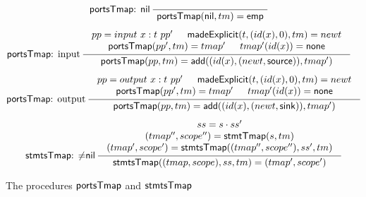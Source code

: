 
\begin{figure}[htbp]
	\begin{gather*}
		\infernone[\portstmap: \nil]
		{\seqq{\portstmap(\nil, tm) = {\sf emp}}}
		\quad
		\\[1ex]
		\infer[\portstmap: input]
		{\seqq{\portstmap(pp, tm) = \fadd((id(x), (newt, \source)), tmap')}}
		{
			\begin{array}{c}
				p p= input\ x: t\ pp' \hspace{15pt} \madeexplicit(t, (id(x),0), tm) = newt \\
				\portstmap(pp', tm) = tmap' \hspace{15pt} tmap'(id(x)) = \svnone
			\end{array}
		}
		\quad
		\\[1ex]
		\infer[\portstmap: output]
		{\seqq{\portstmap(pp, tm) =  \fadd((id(x), (newt, \sink)),tmap')}}
		{
			\begin{array}{c}
				p p= output\ x: t\ pp' \hspace{15pt} \madeexplicit(t, (id(x), 0), tm) = newt \\
				\portstmap(pp', tm) = tmap' \hspace{15pt} tmap'(id(x)) = \svnone
			\end{array}
		}
		\\[1ex]
		\infer[\stmtstmap: $\neq$\nil]
		{\seqq{\stmtstmap((tmap, scope), ss, tm) = (tmap', scope')}}
		{
			\begin{array}{c}
				ss = s\cdot ss' \\
				(tmap'', scope'') = \stmttmap(s, tm) \\
				(tmap', scope') = \stmtstmap((tmap'', scope''), ss', tm)
			\end{array}
		}
	\end{gather*}
	\caption{The procedures ${\sf portsTmap}$ and ${\sf stmtsTmap}$}
	\label{fig:ports-stmts-tmap}
\end{figure}

